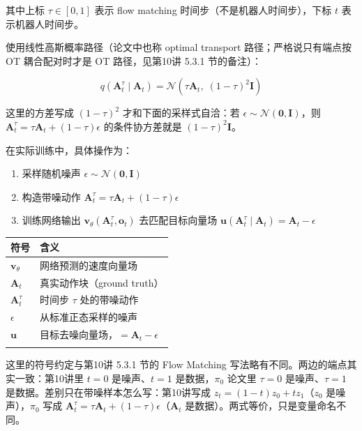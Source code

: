 \documentclass[
  chinese,
]{ctexart}
\providecommand{\tightlist}{%
  \setlength{\itemsep}{0pt}\setlength{\parskip}{0pt}}
\begin{document}
其中上标 \(\tau \in [0, 1]\) 表示 flow matching
时间步（不是机器人时间步），下标 \(t\) 表示机器人时间步。

使用线性高斯概率路径（论文中也称 optimal transport
路径；严格说只有端点按 OT 耦合配对时才是 OT 路径，见第10讲 5.3.1
节的备注）：

\[
q(\mathbf{A}^\tau_t \mid \mathbf{A}_t) = \mathcal{N}\!\left(\tau \mathbf{A}_t,\; (1 - \tau)^2 \mathbf{I}\right)
\]

这里的方差写成 \((1-\tau)^2\) 才和下面的采样式自洽：若
\(\epsilon \sim \mathcal{N}(\mathbf{0}, \mathbf{I})\)，则
\(\mathbf{A}^\tau_t = \tau \mathbf{A}_t + (1-\tau)\epsilon\)
的条件协方差就是 \((1-\tau)^2 \mathbf{I}\)。

在实际训练中，具体操作为：

\begin{enumerate}
\def\labelenumi{\arabic{enumi}.}
\tightlist
\item
  采样随机噪声 \(\epsilon \sim \mathcal{N}(\mathbf{0}, \mathbf{I})\)
\item
  构造带噪动作
  \(\mathbf{A}^\tau_t = \tau \mathbf{A}_t + (1 - \tau) \epsilon\)
\item
  训练网络输出 \(\mathbf{v}_\theta(\mathbf{A}^\tau_t, \mathbf{o}_t)\)
  去匹配目标向量场
  \(\mathbf{u}(\mathbf{A}^\tau_t \mid \mathbf{A}_t) = \mathbf{A}_t - \epsilon\)
\end{enumerate}

\begin{center}
\begin{tabular}{@{}>{\raggedright\arraybackslash}p{} >{\raggedright\arraybackslash}p{}@{}}
\toprule\noalign{}
符号 & 含义 \\
\midrule\noalign{}
\(\mathbf{v}_\theta\) & 网络预测的速度向量场 \\
\(\mathbf{A}_t\) & 真实动作块（ground truth） \\
\(\mathbf{A}^\tau_t\) & 时间步 \(\tau\) 处的带噪动作 \\
\(\epsilon\) & 从标准正态采样的噪声 \\
\(\mathbf{u}\) & 目标去噪向量场，\(= \mathbf{A}_t - \epsilon\) \\
\bottomrule\noalign{}
\end{tabular}
\end{center}

这里的符号约定与第10讲 5.3.1 节的 Flow Matching
写法略有不同。两边的端点其实一致：第10讲里 \(t=0\) 是噪声、\(t=1\)
是数据，\(\pi_0\) 论文里 \(\tau=0\) 是噪声、\(\tau=1\)
是数据。差别只在带噪样本怎么写：第10讲写成
\(z_t = (1-t)z_0 + tz_1\)（\(z_0\) 是噪声），\(\pi_0\) 写成
\(\mathbf{A}^\tau_t = \tau \mathbf{A}_t + (1-\tau)\epsilon\)（\(\mathbf{A}_t\)
是数据）。两式等价，只是变量命名不同。
\end{document}
